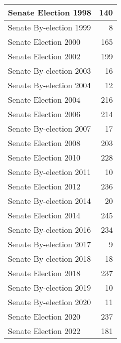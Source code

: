\begin{tabular}{l|r}
\hline
Senate Election 1998 & 140\\
\hline
Senate By-election 1999 & 8\\
\hline
Senate Election 2000 & 165\\
\hline
Senate Election 2002 & 199\\
\hline
Senate By-election 2003 & 16\\
\hline
Senate By-election 2004 & 12\\
\hline
Senate Election 2004 & 216\\
\hline
Senate Election 2006 & 214\\
\hline
Senate By-election 2007 & 17\\
\hline
Senate Election 2008 & 203\\
\hline
Senate Election 2010 & 228\\
\hline
Senate By-election 2011 & 10\\
\hline
Senate Election 2012 & 236\\
\hline
Senate By-election 2014 & 20\\
\hline
Senate Election 2014 & 245\\
\hline
Senate By-election 2016 & 234\\
\hline
Senate By-election 2017 & 9\\
\hline
Senate By-election 2018 & 18\\
\hline
Senate Election 2018 & 237\\
\hline
Senate By-election 2019 & 10\\
\hline
Senate By-election 2020 & 11\\
\hline
Senate Election 2020 & 237\\
\hline
Senate Election 2022 & 181\\
\hline
\end{tabular}
